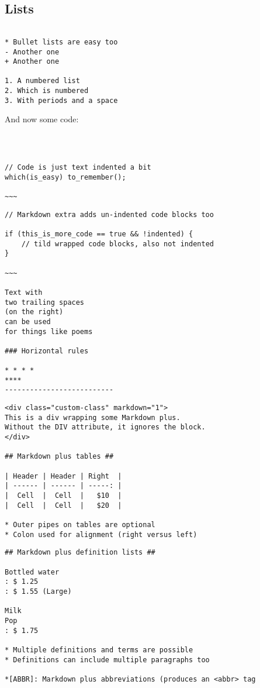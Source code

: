 \documentclass[]{article}
\begin{document}
\subsection*{Lists}
\begin{framed}
	\begin{verbatim}
	
* Bullet lists are easy too
- Another one
+ Another one

1. A numbered list
2. Which is numbered
3. With periods and a space
\end{verbatim}
\end{framed}
And now some code:
\begin{framed}
	\begin{verbatim}
	


// Code is just text indented a bit
which(is_easy) to_remember();

~~~
\end{verbatim}
\end{framed}
\begin{framed}
	\begin{verbatim}
// Markdown extra adds un-indented code blocks too

if (this_is_more_code == true && !indented) {
	// tild wrapped code blocks, also not indented
}

~~~

Text with  
two trailing spaces  
(on the right)  
can be used  
for things like poems  

### Horizontal rules

* * * *
****
--------------------------
\end{verbatim}
\end{framed}

\begin{framed}
\begin{verbatim}
<div class="custom-class" markdown="1">
This is a div wrapping some Markdown plus.  
Without the DIV attribute, it ignores the block. 
</div>

## Markdown plus tables ##

| Header | Header | Right  |
| ------ | ------ | -----: |
|  Cell  |  Cell  |   $10  |
|  Cell  |  Cell  |   $20  |

* Outer pipes on tables are optional
* Colon used for alignment (right versus left)
\end{verbatim}
\end{framed}
\newpage
\begin{framed}
	\begin{verbatim}
## Markdown plus definition lists ##

Bottled water
: $ 1.25
: $ 1.55 (Large)

Milk
Pop
: $ 1.75

* Multiple definitions and terms are possible
* Definitions can include multiple paragraphs too

*[ABBR]: Markdown plus abbreviations (produces an <abbr> tag
\end{verbatim}
\end{framed}
\end{document}
